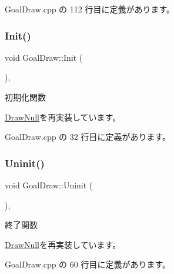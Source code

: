  Goal\+Draw.\+cpp の 112 行目に定義があります。

\mbox{\label{class_goal_draw_a3eb0a555fa2db9d2c1253018ea65796e}} 
\subsubsection{\texorpdfstring{Init()}{Init()}}
{\footnotesize\ttfamily void Goal\+Draw\+::\+Init (\begin{DoxyParamCaption}{ }\end{DoxyParamCaption})\hspace{0.3cm}{\ttfamily [override]}, {\ttfamily [virtual]}}



初期化関数 



\mbox{\hyperlink{class_draw_null_acd7fef3ccea1da537ac9507ffbb6dd2e}{Draw\+Null}}を再実装しています。



 Goal\+Draw.\+cpp の 32 行目に定義があります。

\mbox{\label{class_goal_draw_a01318a0606848a3ca8ca7b7acbf4df24}} 
\subsubsection{\texorpdfstring{Uninit()}{Uninit()}}
{\footnotesize\ttfamily void Goal\+Draw\+::\+Uninit (\begin{DoxyParamCaption}{ }\end{DoxyParamCaption})\hspace{0.3cm}{\ttfamily [override]}, {\ttfamily [virtual]}}



終了関数 



\mbox{\hyperlink{class_draw_null_a12d44e341c7364b5ab9cdd661dc16187}{Draw\+Null}}を再実装しています。



 Goal\+Draw.\+cpp の 60 行目に定義があります。

\mbox{\label{class_goal_draw_a6e003277ed44eb9c800a616b6acbcb20}} 
